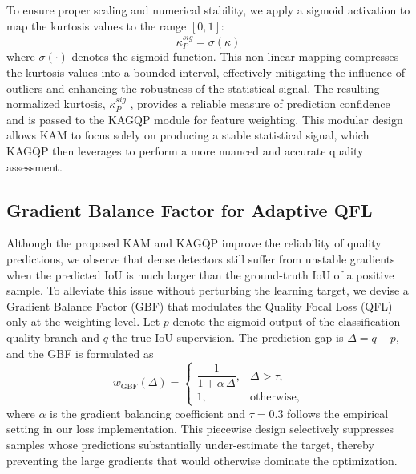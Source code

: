 To ensure proper scaling and numerical stability, we apply a sigmoid activation to map the kurtosis values to the range $[0,1]$:
\begin{equation}
\kappa_P^{sig} = \sigma(\kappa)
\end{equation}
where $\sigma(\cdot)$ denotes the sigmoid function. This non-linear mapping compresses the kurtosis values into a bounded interval, effectively mitigating the influence of outliers and enhancing the robustness of the statistical signal. The resulting normalized kurtosis, $\kappa_P^{sig}$
 , provides a reliable measure of prediction confidence and is passed to the KAGQP module for feature weighting. This modular design allows KAM to focus solely on producing a stable statistical signal, which KAGQP then leverages to perform a more nuanced and accurate quality assessment.

\subsection{Gradient Balance Factor for Adaptive QFL}
Although the proposed KAM and KAGQP improve the reliability of quality predictions, we observe that dense detectors still suffer from unstable gradients when the predicted IoU is much larger than the ground-truth IoU of a positive sample. To alleviate this issue without perturbing the learning target, we devise a Gradient Balance Factor (GBF) that modulates the Quality Focal Loss (QFL) only at the weighting level. Let $p$ denote the sigmoid output of the classification-quality branch and $q$ the true IoU supervision. The prediction gap is $\Delta = q - p$, and the GBF is formulated as
\begin{equation}
    w_{\text{GBF}}(\Delta) =
    \begin{cases}
        \dfrac{1}{1+\alpha\,\Delta}, & \Delta > \tau,\\[6pt]
        1, & \text{otherwise},
    \end{cases}
    \label{eq:gbf}
\end{equation}
where $\alpha$ is the gradient balancing coefficient and $\tau=0.3$ follows the empirical setting in our loss implementation. This piecewise design selectively suppresses samples whose predictions substantially under-estimate the target, thereby preventing the large gradients that would otherwise dominate the optimization.

